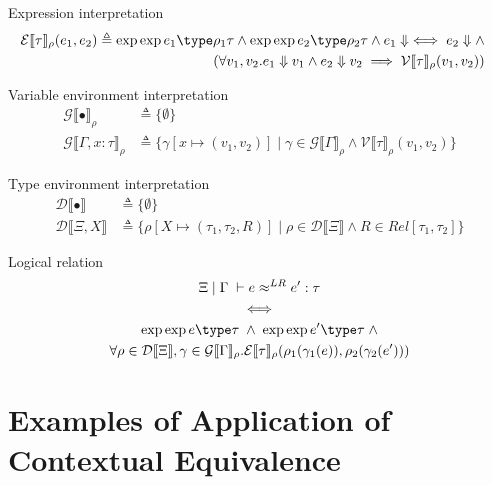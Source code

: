\documentclass[twoside,11pt,openright]{report}
\theoremstyle{definition}
\newcommand{\var}{x}
\newcommand{\expr}{e}
\newcommand{\val}{v}
\newcommand{\Tvar}{X}
\newcommand{\typ}{\tau}
\newcommand{\venv}{\Gamma}
\newcommand{\tenv}{\Xi}
\newcommand{\empvenv}{\bullet}
\newcommand{\emptenv}{\bullet}
\def\envs#1#2\exp#3\type#4{#1 \; | \; #2 \; \vdash #3 : #4}
\newcommand{\ValInp}[2]{\mathcal{V} \llbracket #1 \rrbracket_{#2}}
\newcommand{\ValInpGen}[2]{\ValInp{#1}{#2}(\val_1, \val_2)}
\newcommand{\ExpInp}[2]{\mathcal{E} \llbracket #1 \rrbracket_{#2}}
\newcommand{\VenvInp}[2]{\mathcal{G} \llbracket #1 \rrbracket_{#2}}
\newcommand{\TenvInp}[1]{\mathcal{D} \llbracket #1 \rrbracket}
\newcommand{\LogRel}[5]{#1 \; | \; #2 \; \vdash #3 \approx^{LR} #4 : #5}
\newcommand{\map}[2]{#1 \mapsto #2}
\begin{document}
Expression interpretation
\begin{align*}
  \ExpInp{\typ}{\rho}(\expr_1, \expr_2) &\triangleq 
  \begin{aligned}[t]
    \envs \emptenv \empvenv \exp \expr_1 \type \rho_1{\typ} \land \envs \emptenv \empvenv \exp \expr_2 \type \rho_2{\typ} \land \expr_1 \Downarrow \iff \expr_2 \Downarrow \land\\
    (\forall \val_1, \val_2 . \expr_1 \Downarrow \val_1 \land \expr_2 \Downarrow \val_2 \implies \ValInpGen{\typ}{\rho})
  \end{aligned}
\end{align*}

Variable environment interpretation
\begin{align*}
  \VenvInp{\empvenv}{\rho} &\triangleq \{ \emptyset \}\\
  \VenvInp{\venv, \var : \typ}{\rho} &\triangleq \{\gamma[\map{\var}{(\val_1, \val_2)}] \mid \gamma \in \VenvInp{\venv}{\rho} \land \ValInpGen{\typ}{\rho}\}
\end{align*}

Type environment interpretation
\begin{align*}
  \TenvInp{\empvenv} &\triangleq \{ \emptyset \}\\
  \TenvInp{\tenv, \Tvar} &\triangleq \{\rho[\map{\Tvar}{(\typ_1, \typ_2, R)}] \mid \rho \in \TenvInp{\tenv} \land R \in Rel[\typ_1, \typ_2]\}
\end{align*}

Logical relation
\begin{equation}
  \begin{gathered}
    \LogRel{\tenv}{\venv}{\expr}{\expr'}{\typ}\\
    \iff\\
    \envs \tenv \venv \exp \expr \type \typ \; \land \; \envs \tenv \venv \exp \expr' \type \typ \; \land\\
    \forall \rho \in \TenvInp{\tenv}, \gamma \in \VenvInp{\venv}{\rho} . 
    \ExpInp{\typ}{\rho}(\rho_1(\gamma_1(\expr)), \rho_2(\gamma_2(\expr')))
  \end{gathered}
\end{equation}



\chapter{Examples of Application of Contextual Equivalence}
\label{ch:ACE}
\end{document}
